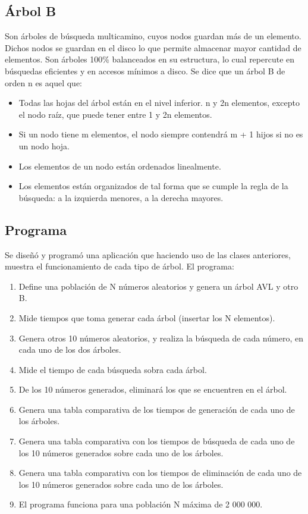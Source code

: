 \documentclass[acmsmall]{acmart}
\begin{document}
\subsection{Árbol B}
Son árboles de búsqueda multicamino, cuyos nodos guardan más de un elemento. Dichos nodos se guardan en el disco lo que permite almacenar mayor cantidad de elementos. Son árboles 100\% balanceados en su estructura, lo cual repercute en búsquedas eficientes y en accesos mínimos a disco. Se dice que un árbol B de orden n es aquel que:
\begin{itemize}
\item Todas las hojas del árbol están en el nivel inferior.
n y 2n elementos, excepto el nodo raíz, que puede tener entre 1 y 2n elementos.
\item Si un nodo tiene m elementos, el nodo siempre
contendrá m + 1 hijos si no es un nodo hoja.
\item Los elementos de un nodo están ordenados
linealmente.
\item Los elementos están organizados de tal forma
que se cumple la regla de la búsqueda: a la
izquierda menores, a la derecha mayores.
\end{itemize}
\subsection{Programa}
Se diseñó y programó una aplicación que haciendo uso de las clases anteriores, muestra el funcionamiento de cada tipo de árbol. El programa:
\begin{enumerate}
 
\item Define una población de N números aleatorios y genera un árbol AVL y otro B.
\item Mide tiempos que toma generar cada árbol (insertar los N elementos).
\item Genera otros 10 números aleatorios, y realiza la búsqueda de cada número, en cada uno de los dos árboles.
\item Mide el tiempo de cada búsqueda sobra cada árbol.
\item De los 10 números generados, eliminará los que se encuentren en el árbol.
\item Genera una tabla comparativa de los tiempos de generación de cada uno de los árboles.
\item Genera una tabla comparativa con los tiempos de búsqueda de cada uno de los 10 números generados sobre cada uno de los árboles.
\item Genera una tabla comparativa con los tiempos de eliminación de cada uno de los 10 números generados sobre cada uno de los árboles.
\item El programa funciona para una población N máxima de 2 000 000.
\end{enumerate}
\end{document}
